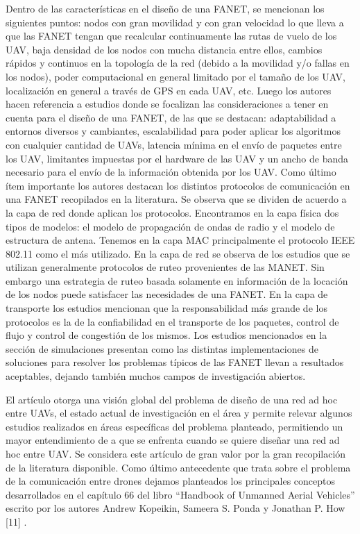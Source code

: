 Dentro de las características en el diseño de una FANET, se mencionan los siguientes puntos: nodos con gran movilidad y con gran velocidad lo que lleva a que las FANET tengan que recalcular continuamente las rutas de vuelo de los UAV, baja densidad de los nodos con mucha distancia entre ellos, cambios rápidos y continuos en la topología de la red (debido a la movilidad y/o fallas en los nodos), poder computacional en general limitado por el tamaño de los UAV, localización en general a través de GPS en cada UAV, etc.   
Luego los autores hacen referencia a estudios donde se focalizan las consideraciones a tener en cuenta para el diseño de una FANET, de las que se destacan: adaptabilidad a entornos diversos y cambiantes, escalabilidad para poder aplicar los algoritmos con cualquier cantidad de UAVs, latencia mínima en el envío de paquetes entre los UAV, limitantes impuestas por el hardware de las UAV y un ancho de banda necesario para el envío de la información obtenida por los UAV.
Como último ítem importante los autores destacan los distintos protocolos de comunicación en una FANET recopilados en la literatura. Se observa que se dividen de acuerdo a la capa de red donde aplican los protocolos. Encontramos en la capa física dos tipos de modelos: el modelo de propagación de ondas de radio y el modelo de estructura de antena. Tenemos en la capa MAC principalmente el protocolo IEEE 802.11 como el más utilizado. En la capa de red se observa de los estudios que se utilizan generalmente protocolos de ruteo provenientes de las MANET. Sin embargo una estrategia de ruteo basada solamente en información de la locación de los nodos puede satisfacer las necesidades de una FANET. En la capa de transporte los estudios mencionan que la responsabilidad más grande de los protocolos es la de la confiabilidad en el transporte de los paquetes, control de flujo y control de congestión de los mismos.
Los estudios mencionados en la sección de simulaciones presentan como las distintas implementaciones de soluciones para resolver los problemas típicos de las FANET llevan a resultados aceptables, dejando también muchos campos de investigación abiertos.

El artículo otorga una visión global del problema de diseño de una red ad hoc entre UAVs, el estado actual de investigación en el área y permite relevar algunos estudios realizados en áreas específicas del problema planteado, permitiendo un mayor entendimiento de a que se enfrenta cuando se quiere diseñar una red ad hoc entre UAV. Se considera este artículo de gran valor por la gran recopilación de la literatura disponible.
Como último antecedente que trata sobre el problema de la comunicación entre drones dejamos planteados los principales conceptos desarrollados en el capítulo 66 del libro “Handbook of Unmanned Aerial Vehicles” escrito por los autores Andrew Kopeikin, Sameera S. Ponda y Jonathan P. How [11] .


